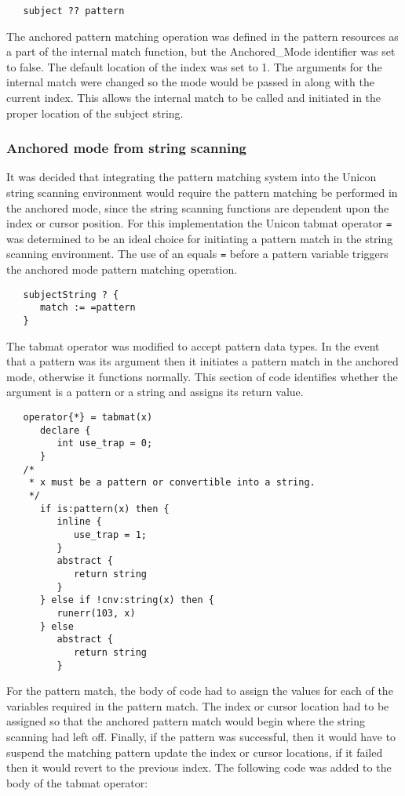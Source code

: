\documentclass{article}
\begin{document}
\begin{verbatim}
   subject ?? pattern
\end{verbatim}

The anchored pattern matching operation was defined in the pattern resources as a part of the internal match function, but the Anchored\_Mode identifier was set to false.  The default location of the index was set to 1.  The arguments for the internal match were changed so the mode would be passed in along with the current index.  This allows the internal match to be called and initiated in the proper location of the subject string.

\subsubsection{Anchored mode from string scanning}
It was decided that integrating the pattern matching system into the Unicon string scanning environment would require the pattern matching be performed in the anchored mode, since the string scanning functions are dependent upon the index or cursor position.  For this implementation the Unicon tabmat operator \texttt{=} was determined to be an ideal choice for initiating a pattern match in the string scanning environment.  The use of an equals \texttt{=} before a pattern variable triggers the anchored mode pattern matching operation.
 
\begin{verbatim}
   subjectString ? {
      match := =pattern
   }
\end{verbatim}

The tabmat operator was modified to accept pattern data types.  In the event that a pattern was its argument then it initiates a pattern match in the anchored mode, otherwise it functions normally.  This section of code identifies whether the argument is a pattern or a string and assigns its return value.

\begin{verbatim}
   operator{*} = tabmat(x)
      declare {
         int use_trap = 0;
      }
   /*
    * x must be a pattern or convertible into a string.
    */
      if is:pattern(x) then {
         inline {
            use_trap = 1;
         }
         abstract {
            return string
         }
      } else if !cnv:string(x) then {
         runerr(103, x)
      } else 
         abstract {
            return string
         }
\end{verbatim}

For the pattern match, the body of code had to assign the values for each of the variables required in the pattern match.  The index or cursor location had to be assigned so that the anchored pattern match would begin where the string scanning had left off.  Finally, if the pattern was successful, then it would have to suspend the matching pattern update the index or cursor locations, if it failed then it would revert to the previous index.  The following code was added to the body of the tabmat operator:
\end{document}
